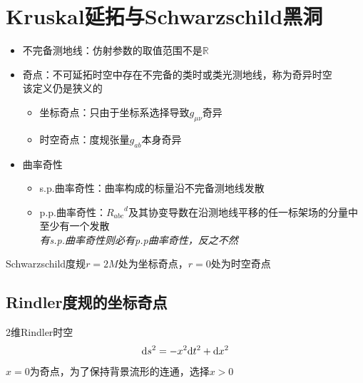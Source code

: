 \section{Kruskal延拓与Schwarzschild黑洞}

\begin{itemize}
    \item 不完备测地线：仿射参数的取值范围不是$\mathbb{R}$
    \item 奇点：不可延拓时空中存在不完备的类时或类光测地线，称为奇异时空\\
    该定义仍是狭义的
    \begin{itemize}
        \item 坐标奇点：只由于坐标系选择导致$g_{\mu \nu}$奇异
        \item 时空奇点：度规张量$g_{ab}$本身奇异
    \end{itemize}
    \item 曲率奇性
    \begin{itemize}
        \item s.p.曲率奇性：曲率构成的标量沿不完备测地线发散
        \item p.p.曲率奇性：${R_{abc}}^d$及其协变导数在沿测地线平移的任一标架场的分量中至少有一个发散\\
        \emph{有s.p.曲率奇性则必有p.p曲率奇性，反之不然}
    \end{itemize}
\end{itemize}
Schwarzschild度规$r=2M$处为坐标奇点，$r=0$处为时空奇点

\subsection{Rindler度规的坐标奇点}

2维Rindler时空
\begin{gather*}
    \mathrm{d} s^2=-x^2 \mathrm{d} t^2+\mathrm{d} x^2
\end{gather*}
$x=0$为奇点，为了保持背景流形的连通，选择$x>0$

